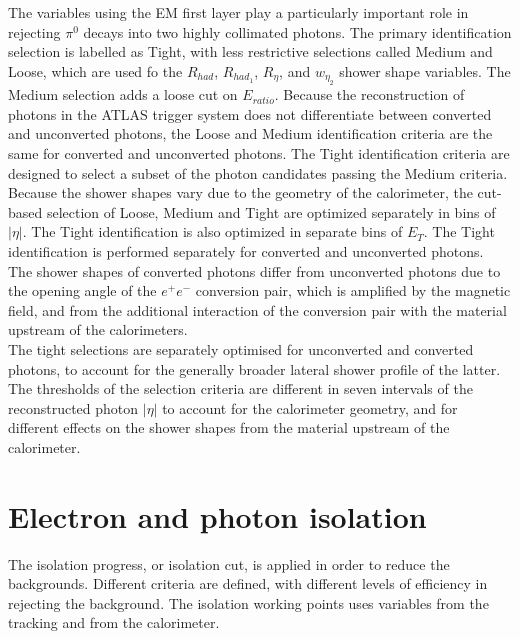 \documentclass[a4paper, oneside]{book}
\begin{document}
			The variables using the EM first layer play a particularly important role in rejecting $\pi^0$ decays into
			two highly collimated photons. The primary identification selection is labelled as Tight, with less restrictive selections called
			Medium and Loose, which are used fo the $R_{had}$, $R_{had_1}$, $R_{\eta}$, and $w_{\eta_2}$ shower shape variables. The Medium selection adds a loose cut on $E_{ratio}$. Because the reconstruction of photons in the ATLAS trigger system does not differentiate between converted and unconverted photons, the Loose and Medium identification criteria are the same for converted
			and unconverted photons. The Tight identification criteria are designed to select a subset of the photon candidates passing the Medium criteria.\\
			Because the shower shapes vary due to the geometry of the calorimeter, the cut-based selection of Loose, Medium and Tight
			are optimized separately in bins of $|\eta|$. The Tight identification is also optimized in separate bins of $E_T$. The Tight identification is performed separately for converted and
			unconverted photons. The shower shapes of converted photons differ from unconverted photons due to the opening angle of the $e^{+}e^{-}$ conversion pair, which is amplified by the magnetic field, and from the additional interaction of the conversion pair with the material upstream of the calorimeters. \\
			The tight selections are separately optimised for unconverted and converted photons, to account for the generally broader lateral shower profile of the latter. The thresholds of the selection criteria are different in seven intervals of the reconstructed photon $|\eta|$ to account for the calorimeter geometry, and for different effects on the shower shapes from the material upstream of the calorimeter.
			
		\section{Electron and photon isolation}
		The isolation progress, or isolation cut, is applied in order to reduce the backgrounds. Different criteria are defined, with different levels
		of efficiency in rejecting the background. The isolation working points uses variables from the tracking and from the calorimeter. \cite{El ph isol}
		
\end{document}
